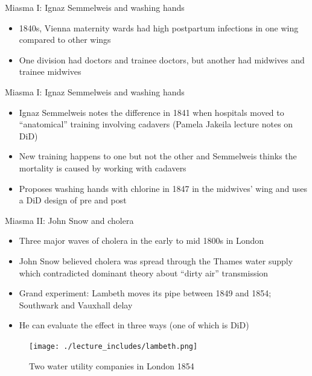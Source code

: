 \documentclass{beamer}
\begin{document}
\begin{frame}{Miasma I: Ignaz Semmelweis and washing hands}

\begin{itemize}
\item 1840s, Vienna maternity wards had high postpartum infections in one wing compared to other wings
\item One division had doctors and trainee doctors, but another had midwives and trainee midwives
\end{itemize}

\end{frame}

\begin{frame}{Miasma I: Ignaz Semmelweis and washing hands}

\begin{itemize}
\item Ignaz Semmelweis notes the difference in 1841 when hospitals moved to ``anatomical'' training involving cadavers (Pamela Jakeila lecture notes on DiD)
\item New training happens to one but not the other and Semmelweis thinks the mortality is caused by working with cadavers
\item Proposes washing hands with chlorine in 1847 in the midwives' wing and uses a DiD design of pre and post
\end{itemize}

\end{frame}



\begin{frame}{Miasma II: John Snow and cholera}

\begin{itemize}
\item Three major waves of cholera in the early to mid 1800s in London
\item John Snow believed cholera was spread through the Thames water supply which contradicted dominant theory about ``dirty air'' transmission
\item Grand experiment: Lambeth moves its pipe between 1849 and 1854; Southwark and Vauxhall delay
\item He can evaluate the effect in three ways (one of which is DiD)
\end{itemize}

\end{frame}


\begin{frame}

	\begin{figure}
	\caption{Two water utility companies in London 1854}
	\texttt{[image: ./lecture\_includes/lambeth.png]}
	\end{figure}


\end{frame}
\end{document}
